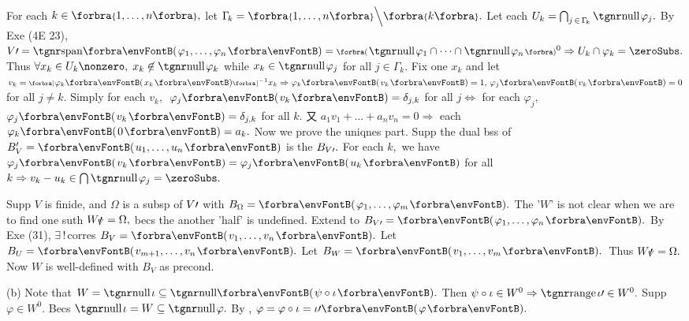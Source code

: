 For each $k\in\Bra{1,\dots,n},$ let $\Gamma_{\!k}=\Bra{1,\dots,n}\Backslash[\Big]\Bra{k}.$ Let each $U_k=\bigcap_{j\,\in\,\Gamma_{\!k}}\null\varphi_j.$\parSol{}
By Exe (4E 23), $V\apostrophe=\Span{\varphi_1,\dots,\varphi_n}=\BigPar{\null\varphi_1\cap\cdots\cap\null\varphi_n}{^0}\Rightarrow U_k\cap\varphi_k=\zeroSubs.$\parSol{}
Thus $\forall x_k\in U_k\nonzero,\;x_k\not\in\null\varphi_k$ while $x_k\in\null\varphi_j$ for all $j\in\Gamma_{\!k}.$\parSol{}
Fix one $x_k$ and let $v_k=\Sbra{\varphi_k\Par{x_k}}{^{-1}}x_k\Rightarrow\varphi_k\Par{v_k}=1,\,\varphi_j\Par{v_k}=0$ for all $j\neq k.$\parSol{}
Simply for each $v_k,$ \,$\varphi_j\Par{v_k}=\delta_{j,k}$ for all $j\Longleftrightarrow$ for each $\varphi_j,$ $\varphi_j\Par{v_k}=\delta_{j,k}$ for all $k.$\parSol{}
又 $a_1v_1+\dots+a_nv_n=0\Rightarrow$ each $\varphi_k\Par{0}=a_k.$\vspace{2pt}\parSol{}
Now we prove the uniqnes part. Supp the dual bss of $B_V'=\Par{u_1,\dots,u_n}$ is the $B_{V\prime}.$\parSol{}
For each $k,$ we have $\varphi_j\Par{v_k}=\varphi_j\Par{u_k}$ for all $k\Rightarrow v_k-u_k\in\bigcap\null\varphi_j=\zeroSubs.$\PfEnd
\SepLine

\BulletPointX{}\;\;Supp $V$ is finide, and $\Omega$ is a subsp of $V\prime$ with $B_{\Omega}=\Par{\varphi_1,\dots,\varphi_m}.$\TextB{}
The '$W$' is not clear when we are to find one suth $W_V\!\!\!\prime\,=\Omega,$ becs the another 'half' is undefined.\TextB{}
Extend to $B_{V\apostrophe}=\Par{\varphi_1,\dots,\varphi_n}.$ By Exe (31), $\exists\,!\,$corres $B_V=\Par{v_1,\dots,v_n}.$ Let $B_U=\Par{v_{m+1},\dots,v_n}.$\TextB{}
Let $B_W=\Par{v_1,\dots,v_m}.$ \,Thus $W_V\!\!\!\prime\,=\Omega.$ Now $W$ is well-defined with $B_V$ as precond.
\SepLine

(b) \Or Note that $W=\null{\iota}\subseteq\Null\Par{\psi\circ\iota}.$ Then $\psi\circ\iota\in W^0\Rightarrow\range\iota\apostrophe\in W^0.$\parSol{\Hb}
\Blind{\Or}Supp $\varphi\in W^0.$ Becs $\null\iota=W\subseteq\null\varphi.$ By , $\varphi=\varphi\circ\iota=\iota\apostrophe\Par{\varphi}.$\PfEnd
\SepLine

